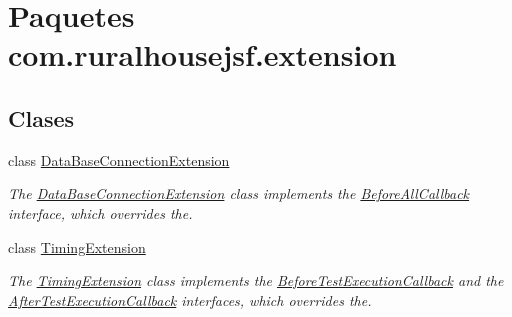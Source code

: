 \hypertarget{a00124}{}\section{Paquetes com.\+ruralhousejsf.\+extension}
\label{a00124}
\subsection*{Clases}
\begin{DoxyCompactItemize}
\item 
class \mbox{\hyperlink{a00264}{Data\+Base\+Connection\+Extension}}
\begin{DoxyCompactList}\small\item\em The \mbox{\hyperlink{a00264}{Data\+Base\+Connection\+Extension}} class implements the \mbox{\hyperlink{}{Before\+All\+Callback}} interface, which overrides the. \end{DoxyCompactList}\item 
class \mbox{\hyperlink{a00268}{Timing\+Extension}}
\begin{DoxyCompactList}\small\item\em The \mbox{\hyperlink{a00268}{Timing\+Extension}} class implements the \mbox{\hyperlink{}{Before\+Test\+Execution\+Callback}} and the \mbox{\hyperlink{}{After\+Test\+Execution\+Callback}} interfaces, which overrides the. \end{DoxyCompactList}\end{DoxyCompactItemize}
